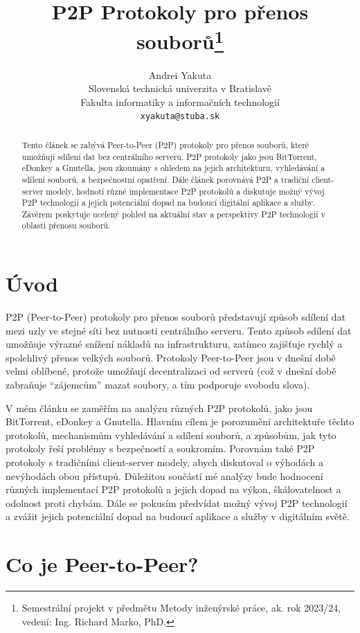 \documentclass[10pt,twoside,czech,a4paper]{article}
\title{P2P Protokoly pro přenos souborů\thanks{Semestrální projekt v předmětu Metody inženýrské práce, ak. rok 2023/24, vedení: Ing. Richard Marko, PhD.}}
\author{Andrei Yakuta\\[2pt]
	{\small Slovenská technická univerzita v Bratislavě}\\
	{\small Fakulta informatiky a informačních technologií}\\
	{\small \texttt{xyakuta@stuba.sk}}
	}
\begin{document}
\maketitle

\begin{abstract}
Tento článek se zabývá Peer-to-Peer (P2P) protokoly pro přenos souborů, které umožňují sdílení dat bez centrálního serveru.
P2P protokoly jako jsou BitTorrent, eDonkey a Gnutella, jsou zkoumány s ohledem na jejich architekturu, vyhledávání a sdílení souborů, a bezpečnostní opatření.
Dále článek porovnává P2P a tradiční client-server modely, hodnotí různé implementace P2P protokolů a diskutuje možný vývoj P2P technologií a jejich potenciální dopad na budoucí digitální aplikace a služby.
Závěrem poskytuje ucelený pohled na aktuální stav a perspektivy P2P technologií v oblasti přenosu souborů.
\end{abstract}



\section{Úvod}

P2P (Peer-to-Peer) protokoly pro přenos souborů představují způsob sdílení dat mezi uzly ve stejné síti bez nutnosti centrálního serveru.
Tento způsob sdílení dat umožňuje výrazné snížení nákladů na infrastrukturu, zatímco zajišťuje rychlý a spolehlivý přenos velkých souborů.
Protokoly Peer-to-Peer jsou v dnešní době velmi oblíbené, protože umožňují decentralizaci od serverů (což v dnešní době zabraňuje “zájemcům” mazat soubory, a tím podporuje svobodu slova).

V mém článku se zaměřím na analýzu různých P2P protokolů, jako jsou BitTorrent, eDonkey a Gnutella.
Hlavním cílem je porozumění architektuře těchto protokolů, mechanismům vyhledávání a sdílení souborů, a způsobům, jak tyto protokoly řeší problémy s bezpečností a soukromím.
Porovnám také P2P protokoly s tradičními client-server modely, abych diskutoval o výhodách a nevýhodách obou přístupů.
Důležitou součástí mé analýzy bude hodnocení různých implementací P2P protokolů a jejich dopad na výkon, škálovatelnost a odolnost proti chybám.
Dále se pokusím předvídat možný vývoj P2P technologií a zvážit jejich potenciální dopad na budoucí aplikace a služby v digitálním světě.


\section{Co je Peer-to-Peer?}
\end{document}
